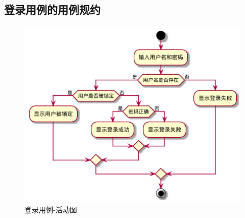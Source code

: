 
\subsection{登录用例的用例规约}

    \begin{figure}[htp]
        \centering
        \includegraphics[width=12cm]{figure/usecase/uc_sub/uc_login.png}
        \caption{登录用例-活动图}
        \label{fig:logon-uml}
    \end{figure}
    

